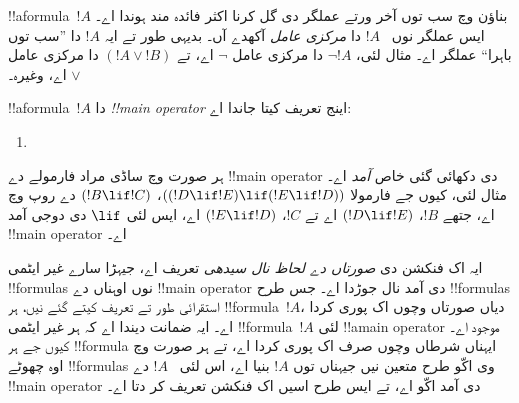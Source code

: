 \documentclass[../../../include/open-logic-section]{subfiles}
\begin{document}


\begin{explain}
!!a{formula}~$!A$ بناؤن وچ سب توں آخر ورتے عملگر
دی گل کرنا اکثر فائدہ مند ہوندا اے۔ ایس عملگر نوں
~$!A$ دا \emph{مرکزی عامل} آکھدے آں۔ بدیہی طور
تے ایہ $!A$ دا ”سب توں باہرا“ عملگر اے۔ مثال
لئی، $\lnot !A$ دا مرکزی عامل $\lnot$ اے،
تے $(!A \lor !B)$ دا مرکزی عامل $\lor$ اے، وغیرہ۔
\end{explain}


\begin{defn}
!!a{formula}~$!A$ دا \emph{!!{main operator}}
اینج تعریف کیتا جاندا اے:
\begin{enumerate}
\item {}







\end{enumerate}
\end{defn}

ہر صورت وچ ساڈی مراد فارمولے دے !!{main operator}
دی دکھائی گئی خاص \emph{آمد} اے۔ مثال لئی، کیوں جے
فارمولا $((!D \lif !E) \lif (!E \lif !D))$، $(!B \lif !C)$
دے روپ وچ اے، جتھے $!B$، $(!D \lif !E)$ اے تے
$!C$، $(!E \lif !D)$ اے، ایس لئی $\lif$ دی
دوجی آمد !!{main operator} اے۔

\begin{explain}
ایہ اک فنکشن دی \emph{صورتاں دے لحاظ نال سیدھی} تعریف اے، جیہڑا سارے
غیر ایٹمی !!{formula}s نوں اوہناں دے !!{main operator}
دی آمد نال جوڑدا اے۔ جس طرح !!{formula}s
استقرائی طور تے تعریف کیتے گئے نیں، ہر
!!{formula}~$!A$،  دیاں
صورتاں وچوں اک پوری کردا اے۔ ایہ ضمانت دیندا
اے کہ ہر غیر ایٹمی !!{formula}~$!A$ لئی
!!a{main
  operator} موجود اے۔ کیوں جے ہر !!{formula}
ایہناں شرطاں وچوں صرف اک پوری کردا اے، تے
ہر صورت وچ اوہ چھوٹے !!{formula}s وی اکّو طرح
متعین نیں جیہناں توں $!A$ بنیا اے، اس لئی
~$!A$ دے !!{main
  operator} دی آمد اکّو اے، تے ایس طرح
اسیں اک فنکشن تعریف کر دتا اے۔
\end{explain}
\end{document}
